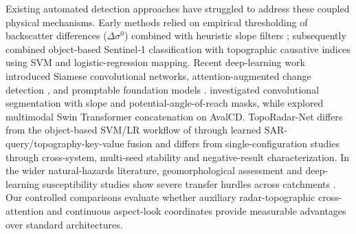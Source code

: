 Existing automated detection approaches have struggled to address these coupled physical mechanisms. Early methods relied on empirical thresholding of backscatter differences ($\Delta \sigma^0$) combined with heuristic slope filters \citep{eckerstorfer2019near, vickers2016method}; \citet{liu2021object} subsequently combined object-based Sentinel-1 classification with topographic causative indices using SVM and logistic-regression mapping. Recent deep-learning work introduced Siamese convolutional networks, attention-augmented change detection \citep{daudt2018fully, zhang2018road, chen2021remote, bandara2022transformer, gatti2026avalanche}, and promptable foundation models \citep{gelato2026promptable}. \citet{bianchi2021snow} investigated convolutional segmentation with slope and potential-angle-of-reach masks, while \citet{gatti2026avalanche} explored multimodal Swin Transformer concatenation on AvalCD. TopoRadar-Net differs from the object-based SVM/LR workflow of \citet{liu2021object} through learned SAR-query/topography-key-value fusion and differs from single-configuration studies through cross-system, multi-seed stability and negative-result characterization. In the wider natural-hazards literature, geomorphological assessment and deep-learning susceptibility studies show severe transfer hurdles across catchments \citep{wang2023evaluation, sajjad2024assessing, zhou2023deformation, guo2025forecasting, guo2024landslide, garova2025general, liu2026integrating}. Our controlled comparisons evaluate whether auxiliary radar-topographic cross-attention and continuous aspect-look coordinates provide measurable advantages over standard architectures.

